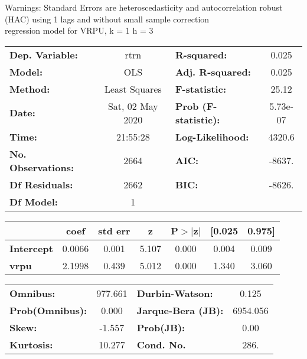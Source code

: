 Warnings: \newline
 [1] Standard Errors are heteroscedasticity and autocorrelation robust (HAC) using 1 lags and without small sample correction\\ 

regression model for VRPU, k = 1 h = 3\begin{center}
\begin{tabular}{lclc}
\toprule
\textbf{Dep. Variable:}    &       rtrn       & \textbf{  R-squared:         } &     0.025   \\
\textbf{Model:}            &       OLS        & \textbf{  Adj. R-squared:    } &     0.025   \\
\textbf{Method:}           &  Least Squares   & \textbf{  F-statistic:       } &     25.12   \\
\textbf{Date:}             & Sat, 02 May 2020 & \textbf{  Prob (F-statistic):} &  5.73e-07   \\
\textbf{Time:}             &     21:55:28     & \textbf{  Log-Likelihood:    } &    4320.6   \\
\textbf{No. Observations:} &        2664      & \textbf{  AIC:               } &    -8637.   \\
\textbf{Df Residuals:}     &        2662      & \textbf{  BIC:               } &    -8626.   \\
\textbf{Df Model:}         &           1      & \textbf{                     } &             \\
\bottomrule
\end{tabular}
\begin{tabular}{lcccccc}
                   & \textbf{coef} & \textbf{std err} & \textbf{z} & \textbf{P$> |$z$|$} & \textbf{[0.025} & \textbf{0.975]}  \\
\midrule
\textbf{Intercept} &       0.0066  &        0.001     &     5.107  &         0.000        &        0.004    &        0.009     \\
\textbf{vrpu}      &       2.1998  &        0.439     &     5.012  &         0.000        &        1.340    &        3.060     \\
\bottomrule
\end{tabular}
\begin{tabular}{lclc}
\textbf{Omnibus:}       & 977.661 & \textbf{  Durbin-Watson:     } &    0.125  \\
\textbf{Prob(Omnibus):} &   0.000 & \textbf{  Jarque-Bera (JB):  } & 6954.056  \\
\textbf{Skew:}          &  -1.557 & \textbf{  Prob(JB):          } &     0.00  \\
\textbf{Kurtosis:}      &  10.277 & \textbf{  Cond. No.          } &     286.  \\
\bottomrule
\end{tabular}
\end{center}


